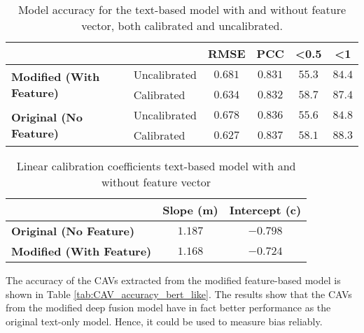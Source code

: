 \begin{table}[H]
    \centering
    \begin{tabular}{|l|l|c|c|c|c|}
        \hline
        \multicolumn{2}{|l|}{\textbf{}} & \textbf{RMSE} & \textbf{PCC} & \textbf{\textless 0.5} & \textbf{\textless 1}          \\ \hline
        \multirow{2}{*}{\textbf{Modified (With Feature)}}
                                        & Uncalibrated  & $0.681$      & $0.831$                & $55.3$               & $84.4$ \\ \cline{2-6}
                                        & Calibrated    & $0.634$      & $0.832$                & $58.7$               & $87.4$ \\ \hline
        \multirow{2}{*}{\textbf{Original (No Feature)}}
                                        & Uncalibrated  & $0.678$      & $0.836$                & $55.6$               & $84.8$ \\ \cline{2-6}
                                        & Calibrated    & $0.627$      & $0.837$                & $58.1$               & $88.3$ \\ \hline
    \end{tabular}
    \caption{Model accuracy for the text-based model with and without feature vector, both calibrated and uncalibrated.}
    \label{tab:model_accuracy_deep_fusion}
\end{table}


\begin{table}[H]
    \centering
    \begin{tabular}{|l|c|c|}
        \hline
        \textbf{}                        & \textbf{Slope (m)} & \textbf{Intercept (c)} \\ \hline
        \textbf{Original (No Feature)}   & $1.187$            & $-0.798$               \\ \hline
        \textbf{Modified (With Feature)} & $1.168$            & $-0.724$               \\ \hline
    \end{tabular}
    \caption{Linear calibration coefficients text-based model with and without feature vector}
    \label{tab:linear_regression_coefficients_deep_fusion}
\end{table}

The accuracy of the CAVs extracted from the modified feature-based model is shown in Table \ref{tab:CAV_accuracy_bert_like}. The results show that the CAVs from the modified deep fusion model have in fact better performance as the original text-only model. Hence, it could be used to measure bias reliably.

